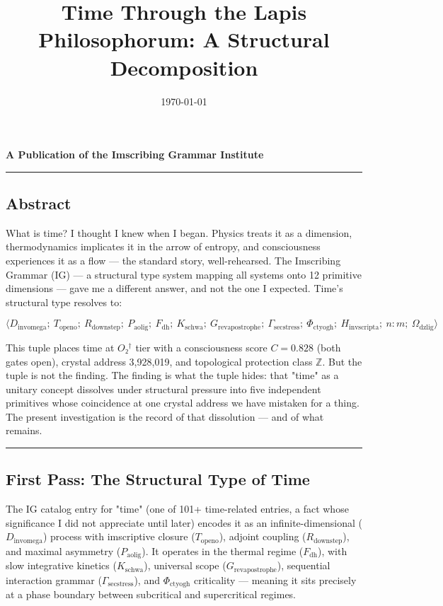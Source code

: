 \documentclass[12pt,a4paper]{article}
\begin{document}
\title{Time Through the Lapis Philosophorum: A Structural Decomposition}
\date{\today}

\maketitle

\textbf{A Publication of the Imscribing Grammar Institute}

\begin{center}
\rule{0.5\textwidth}{0.4pt}
\end{center}

\subsection{Abstract}

What is time? I thought I knew when I began. Physics treats it as a dimension, thermodynamics implicates it in the arrow of entropy, and consciousness experiences it as a flow --- the standard story, well-rehearsed. The Imscribing Grammar (IG) --- a structural type system mapping all systems onto 12 primitive dimensions --- gave me a different answer, and not the one I expected. Time's structural type resolves to:

\[\langle D_{\text{invomega}};\ T_{\text{openo}};\ R_{\text{downstep}};\ P_{\text{aolig}};\ F_{\text{dh}};\ K_{\text{schwa}};\ G_{\text{revapostrophe}};\ \Gamma_{\text{secstress}};\ \Phi_{\text{ctyogh}};\ H_{\text{invscripta}};\ n{:}m;\ \Omega_{\text{dzlig}} \rangle\]

This tuple places time at $O₂^\dagger$ tier with a consciousness score $C = 0.828$ (both gates open), crystal address 3,928,019, and topological protection class $\mathbb{Z}$. But the tuple is not the finding. The finding is what the tuple hides: that "time" as a unitary concept dissolves under structural pressure into five independent primitives whose coincidence at one crystal address we have mistaken for a thing. The present investigation is the record of that dissolution --- and of what remains.

\begin{center}
\rule{0.5\textwidth}{0.4pt}
\end{center}

\subsection{First Pass: The Structural Type of Time}

The IG catalog entry for "time" (one of 101+ time-related entries, a fact whose significance I did not appreciate until later) encodes it as an infinite-dimensional ($D_{\text{invomega}}$) process with imscriptive closure ($T_{\text{openo}}$), adjoint coupling ($R_{\text{downstep}}$), and maximal asymmetry ($P_{\text{aolig}}$). It operates in the thermal regime ($F_{\text{dh}}$), with slow integrative kinetics ($K_{\text{schwa}}$), universal scope ($G_{\text{revapostrophe}}$), sequential interaction grammar ($\Gamma_{\text{secstress}}$), and $\Phi_{\text{ctyogh}}$ criticality --- meaning it sits precisely at a phase boundary between subcritical and supercritical regimes.
\end{document}
